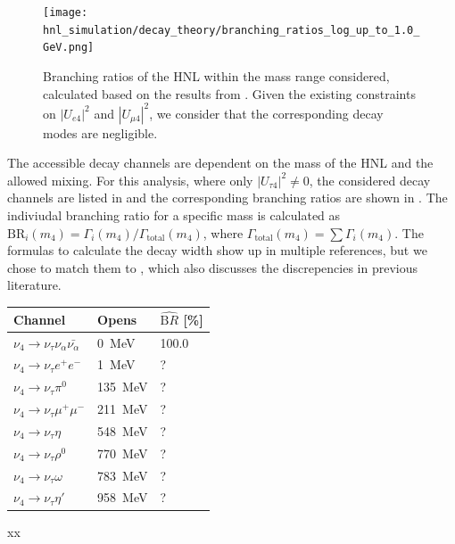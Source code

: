 \begin{figure}
    \texttt{[image: hnl\_simulation/decay\_theory/branching\_ratios\_log\_up\_to\_1.0\_GeV.png]}
    \caption{Branching ratios of the HNL within the mass range considered, calculated based on the results from \cite{Coloma:2020lgy}. Given the existing constraints on $|U_{e4}|^{2}$ and $|U_{\mu4}|^{2}$, we consider that the corresponding decay modes are negligible.}
\end{figure}

The accessible decay channels are dependent on the mass of the HNL and the allowed mixing. For this analysis, where only $|U_{\tau4}|^2 \neq 0$, the considered decay channels are listed in  and the corresponding branching ratios are shown in . The indiviudal branching ratio for a specific mass is calculated as $\mathrm{BR}_i(m_4)=\Gamma_i(m_4)/\Gamma_\mathrm{total}(m_4)$, where $\Gamma_\mathrm{total}(m_4)=\sum\Gamma_i(m_4)$. The formulas to calculate the decay width show up in multiple references, but we chose to match them to , which also discusses the discrepencies in previous literature.

\begin{margintable}
    \footnotesize
    \begin{tabular} { lll }
        \hline\hline 
        \textbf{Channel} & \textbf{Opens} & \textbf{$\hat{\mathrm BR}$ [\%]} \\
        \hline\hline 
        $\nu_4 \rightarrow \nu_\tau \nu_\alpha \bar{\nu_\alpha}$ & \SI{0}{\MeV} & 100.0 \\
        $\nu_4 \rightarrow \nu_\tau e^+ e^-$ & \SI{1}{\MeV} & ? \\
        $\nu_4 \rightarrow \nu_\tau \pi^0$ & \SI{135}{\MeV} & ? \\
        $\nu_4 \rightarrow \nu_\tau \mu^+ \mu^-$ & \SI{211}{\MeV} & ? \\
        $\nu_4 \rightarrow \nu_\tau \eta$ & \SI{548}{\MeV} & ? \\
        $\nu_4 \rightarrow \nu_\tau \rho^0$ & \SI{770}{\MeV} & ? \\
        $\nu_4 \rightarrow \nu_\tau \omega$ & \SI{783}{\MeV} & ? \\
        $\nu_4 \rightarrow \nu_\tau \eta'$ & \SI{958}{\MeV} & ? \\
        \hline
    \end{tabular}
    \caption[xx]{xx}
\end{margintable}



